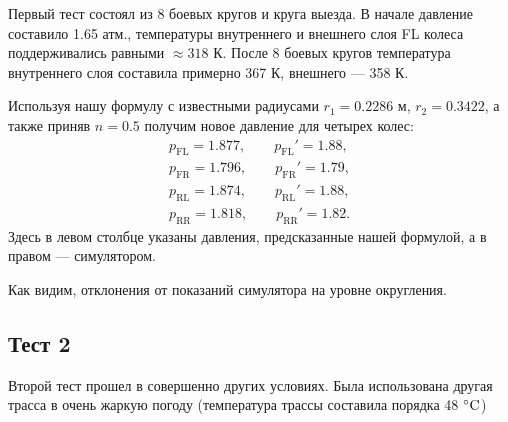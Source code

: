 \documentclass[a4paper,12pt]{report}
\begin{document}
        Первый тест состоял из 8 боевых кругов и круга выезда. В начале давление составило 1.65 атм., температуры внутреннего и внешнего слоя FL колеса поддерживались равными $\approx 318$ К. После 8 боевых кругов температура внутреннего слоя составила примерно 367 К, внешнего --- 358 К. 

        Используя нашу формулу с известными радиусами $r_1=0.2286$ м, $r_2=0.3422$, а также приняв $n=0.5$ получим новое давление для четырех колес:
        \begin{gather*}
            p_\text{FL}=1.877, \qquad p_\text{FL}'=1.88,\\
            p_\text{FR}=1.796, \qquad p_\text{FR}'=1.79,\\
            p_\text{RL}=1.874, \qquad p_\text{RL}'=1.88,\\
            p_\text{RR}=1.818, \qquad p_\text{RR}'=1.82.
        \end{gather*}
        Здесь в левом столбце указаны давления, предсказанные нашей формулой, а в правом --- симулятором.

        Как видим, отклонения от показаний симулятора на уровне округления.
    \subsection{Тест 2}
        Второй тест прошел в совершенно других условиях. Была использована другая трасса в очень жаркую погоду (температура трассы составила порядка 48 $\celsius$)
\end{document}
